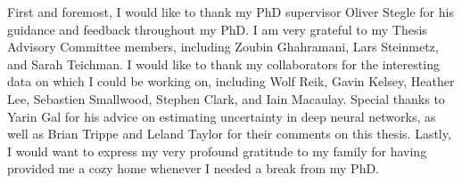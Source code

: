 
\begin{acknowledgements}

First and foremost, I would like to thank my PhD supervisor Oliver Stegle for his guidance and feedback throughout my PhD. I am very grateful to my Thesis Advisory Committee members, including Zoubin Ghahramani, Lars Steinmetz, and Sarah Teichman. I would like to thank my collaborators for the interesting data on which I could be working on, including Wolf Reik, Gavin Kelsey, Heather Lee, Sebastien Smallwood, Stephen Clark, and Iain Macaulay. Special thanks to Yarin Gal for his advice on estimating uncertainty in deep neural networks, as well as Brian Trippe and Leland Taylor for their comments on this thesis. Lastly, I would want to express my very profound gratitude to my family for having provided me a cozy home whenever I needed a break from my PhD.

\end{acknowledgements}
